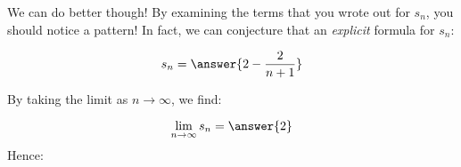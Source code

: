 \documentclass{ximera}
\begin{document}
\begin{exercise}
\begin{exercise}
\begin{exercise}
\begin{exercise}
We can do better though!  By examining the terms that you wrote out for $s_n$, you should notice a pattern!  In fact, we can conjecture that an \emph{explicit} formula for $s_n$:

\[
s_n = \answer{2 - \frac{2}{n+1}}
\]
\begin{exercise}
By taking the limit as $n \to \infty$, we find:

\[
\lim_{n \to \infty} s_n = \answer{2}
\]
Hence:
\begin{multipleChoice}
\end{multipleChoice}

\end{exercise}
\end{exercise}
\end{exercise}
\end{exercise}
\end{exercise}
\end{document}
